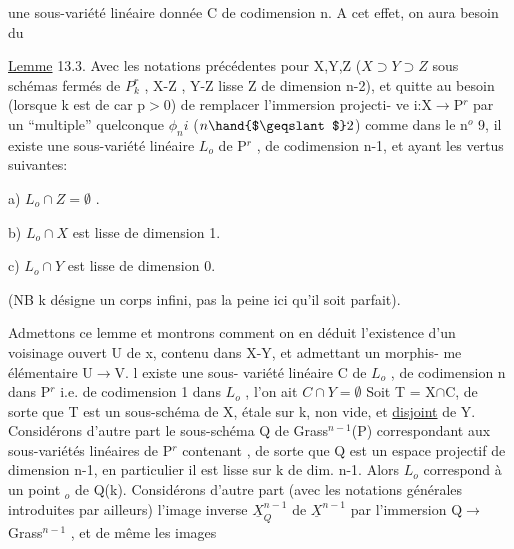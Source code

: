 
une sous-variété linéaire donnée C  de codimension n.  A cet effet,
on aura besoin du

\uline{Lemme} 13.3.  Avec les notations précédentes pour  X,Y,Z  ($X\supset Y\supset Z$
sous schémas fermés de $P^r_k$ , X-Z\hand{,} ,
Y-Z lisse \hand{,} Z de dimension \hand{$\leqslant$}n-2), et quitte
au besoin (lorsque k est de car p$>$0)  de remplacer l'immersion projecti-%
ve  i:X$\rightarrow$P$^r$  par  un ``multiple'' quelconque $\phi_n i$ ($n \hand{$\geqslant$} 2$)  comme dans le
n$^o$ 9,  il existe une sous-variété linéaire  $L_o$ de P$^r$ , de codimension
n-1, et ayant les vertus suivantes:

a)  $L_o \cap Z = \emptyset$ .

b)  $L_o \cap X$  est lisse de dimension 1.

c)  $L_o \cap Y$   est lisse de dimension  0.

(NB  k désigne un corps infini, pas la peine ici qu'il soit parfait).

Admettons  ce lemme  et montrons comment on en déduit  l'existence
d'un voisinage ouvert U de x, contenu dans X-Y, et admettant un morphis-%
me élémentaire U$\longrightarrow$V.  
 l existe une sous-%
variété linéaire C de $L_o$ , de codimension n dans P$^r$ i.e. de codimension
1 dans $L_o$ ,  
 l'on ait  $C \cap Y = \emptyset$  
 Soit  T = X$\cap$C, de sorte que T est un sous-schéma de X,
étale sur k, non vide, et \uline{disjoint} de Y.  Considérons d'autre part le
sous-schéma Q de Grass$^{n-1}$(P) correspondant aux sous-variétés linéaires
de P$^r$ contenant , de sorte que  Q est un  espace projectif
de dimension n-1,   en particulier il est lisse sur k de dim. n-1.
Alors $L_o$ correspond à un point \hand{$\xi$}$_o$ de Q(k).  Considérons d'autre part
(avec les notations générales introduites par ailleurs)  l'image inverse
$\underline{X}^{n-1}_Q$ de $\underline{X}^{n-1}$  par  l'immersion Q$\longrightarrow$ Grass$^{n-1}$ , et de même les images

